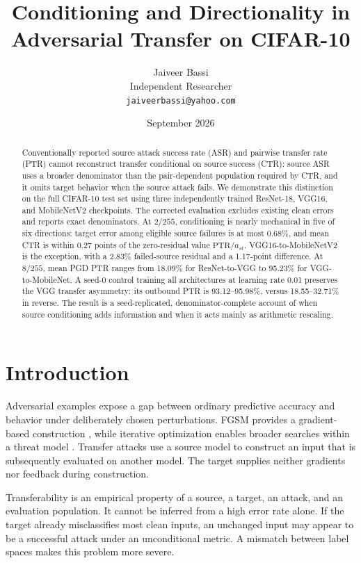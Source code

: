 \documentclass[10pt,twocolumn]{article}
\title{Conditioning and Directionality in Adversarial Transfer on CIFAR-10}
\author{Jaiveer Bassi\\Independent Researcher\\\texttt{jaiveerbassi@yahoo.com}}
\date{September 2026}
\begin{document}
\maketitle
\begin{abstract}
Conventionally reported source attack success rate (ASR) and pairwise transfer rate (PTR) cannot reconstruct transfer conditional on source success (CTR): source ASR uses a broader denominator than the pair-dependent population required by CTR, and it omits target behavior when the source attack fails. We demonstrate this distinction on the full CIFAR-10 test set using three independently trained ResNet-18, VGG16, and MobileNetV2 checkpoints. The corrected evaluation excludes existing clean errors and reports exact denominators. At $2/255$, conditioning is nearly mechanical in five of six directions: target error among eligible source failures is at most 0.68\%, and mean CTR is within 0.27 points of the zero-residual value $\mathrm{PTR}/a_{st}$. VGG16-to-MobileNetV2 is the exception, with a 2.83\% failed-source residual and a 1.17-point difference. At $8/255$, mean PGD PTR ranges from 18.09\% for ResNet-to-VGG to 95.23\% for VGG-to-MobileNet. A seed-0 control training all architectures at learning rate 0.01 preserves the VGG transfer asymmetry: its outbound PTR is 93.12--95.98\%, versus 18.55--32.71\% in reverse. The result is a seed-replicated, denominator-complete account of when source conditioning adds information and when it acts mainly as arithmetic rescaling.
\end{abstract}

\section{Introduction}
Adversarial examples expose a gap between ordinary predictive accuracy and behavior under deliberately chosen perturbations. FGSM provides a gradient-based construction \cite{goodfellow}, while iterative optimization enables broader searches within a threat model \cite{madry,carlini}. Transfer attacks use a source model to construct an input that is subsequently evaluated on another model. The target supplies neither gradients nor feedback during construction.

Transferability is an empirical property of a source, a target, an attack, and an evaluation population. It cannot be inferred from a high error rate alone. If the target already misclassifies most clean inputs, an unchanged input may appear to be a successful attack under an unconditional metric. A mismatch between label spaces makes this problem more severe.
\end{document}
